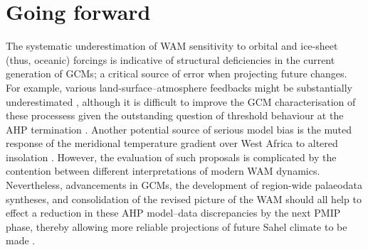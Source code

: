 \documentclass[a4paper]{article}
\begin{document}
\section*{Going forward}
The systematic underestimation of WAM sensitivity to orbital and ice-sheet (thus, oceanic) forcings is indicative of structural deficiencies in the current generation of GCMs; a critical source of error when projecting future changes.
For example, various land-surface--atmosphere feedbacks might be substantially underestimated \parencite{harrison2015evaluation, tierney2017rainfall}, although it is difficult to improve the GCM characterisation of these processess given the outstanding question of threshold behaviour at the AHP termination \parencite{claussen2017theory}. 
Another potential source of serious model bias is the muted response of the meridional temperature gradient over West Africa to altered insolation \parencite{zheng2013characterization}.
However, the evaluation of such proposals is complicated by the contention between different interpretations of modern WAM dynamics. 
Nevertheless, advancements in GCMs, the development of region-wide palaeodata syntheses, and consolidation of the revised picture of the WAM should all help to effect a reduction in these AHP model--data discrepancies by the next PMIP phase, thereby allowing more reliable projections of future Sahel climate to be made \parencite{braconnot2012evaluation, harrison2015evaluation}.

\printbibliography{}
\end{document}
